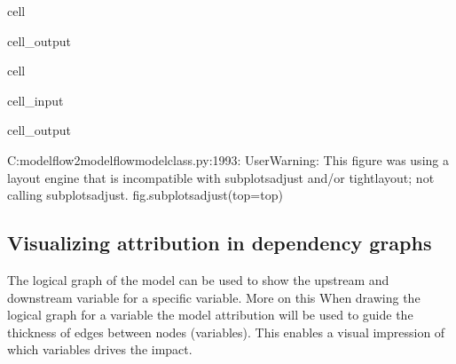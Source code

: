 \documentclass[letterpaper,10pt,english]{jupyterBook}
\begin{document}
\begin{sphinxuseclass}{cell}
\begin{sphinxVerbatimOutput}
\begin{sphinxuseclass}{cell_output}
\end{sphinxuseclass}\end{sphinxVerbatimOutput}

\end{sphinxuseclass}
\begin{sphinxuseclass}{cell}\begin{sphinxVerbatimInput}

\begin{sphinxuseclass}{cell_input}
\begin{sphinxVerbatim}[commandchars=\\\{\}]
   
\end{sphinxVerbatim}

\end{sphinxuseclass}\end{sphinxVerbatimInput}
\begin{sphinxVerbatimOutput}

\begin{sphinxuseclass}{cell_output}
\begin{sphinxVerbatim}[commandchars=\\\{\}]
C:\PYGZbs{}modelflow2\PYGZbs{}modelflow\PYGZbs{}modelclass.py:1993: UserWarning: This figure was using a layout engine that is incompatible with subplots\PYGZus{}adjust and/or tight\PYGZus{}layout; not calling subplots\PYGZus{}adjust.
  fig.subplots\PYGZus{}adjust(top=top)
\end{sphinxVerbatim}

\noindent{}

\end{sphinxuseclass}\end{sphinxVerbatimOutput}

\end{sphinxuseclass}

\subsection{Visualizing attribution in dependency graphs}
\label{\detokenize{content/howto/attribution/Attribution background:visualizing-attribution-in-dependency-graphs}}
\sphinxAtStartPar
The logical graph of the model can be used to show the upstream and downstream variable for a specific variable. More on this {\hyperref[\detokenize{content/howto/structure/Logical_structure::doc}]{}}
When drawing the logical graph for a variable the model attribution will be used to guide the thickness of edges between nodes (variables). This enables a visual impression of which
variables drives the impact.
\end{document}
